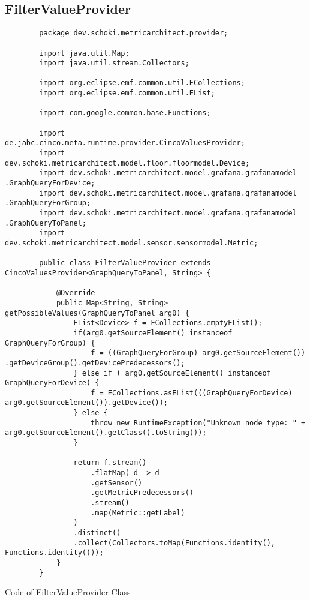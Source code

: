 \subsection{FilterValueProvider}
\begin{longlisting}
	\begin{verbatim}
		package dev.schoki.metricarchitect.provider;
		
		import java.util.Map;
		import java.util.stream.Collectors;
		
		import org.eclipse.emf.common.util.ECollections;
		import org.eclipse.emf.common.util.EList;
		
		import com.google.common.base.Functions;
		
		import de.jabc.cinco.meta.runtime.provider.CincoValuesProvider;
		import dev.schoki.metricarchitect.model.floor.floormodel.Device;
		import dev.schoki.metricarchitect.model.grafana.grafanamodel .GraphQueryForDevice;
		import dev.schoki.metricarchitect.model.grafana.grafanamodel .GraphQueryForGroup;
		import dev.schoki.metricarchitect.model.grafana.grafanamodel .GraphQueryToPanel;
		import dev.schoki.metricarchitect.model.sensor.sensormodel.Metric;
		
		public class FilterValueProvider extends CincoValuesProvider<GraphQueryToPanel, String> {
			
			@Override
			public Map<String, String> getPossibleValues(GraphQueryToPanel arg0) {
				EList<Device> f = ECollections.emptyEList();
				if(arg0.getSourceElement() instanceof GraphQueryForGroup) {
					f = ((GraphQueryForGroup) arg0.getSourceElement()) .getDeviceGroup().getDevicePredecessors();
				} else if ( arg0.getSourceElement() instanceof GraphQueryForDevice) {
					f = ECollections.asEList(((GraphQueryForDevice) arg0.getSourceElement()).getDevice());
				} else {
					throw new RuntimeException("Unknown node type: " + arg0.getSourceElement().getClass().toString());
				}
				
				return f.stream()
					.flatMap( d -> d
					.getSensor()
					.getMetricPredecessors()
					.stream()
					.map(Metric::getLabel)
				)
				.distinct()
				.collect(Collectors.toMap(Functions.identity(), Functions.identity()));
			}
		}
	\end{verbatim}
	\caption{Code of FilterValueProvider Class}
	\label{lst:classFilterValueProvider}
\end{longlisting}

